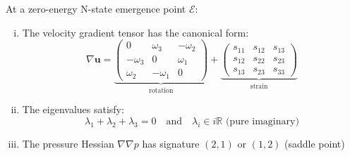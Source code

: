 \begin{theorem}\label{thm:emergence-structure}
At a zero-energy N-state emergence point $\mathcal{E}$:
\begin{enumerate}[(i)]
\item The velocity gradient tensor has the canonical form:
\begin{equation}
\nabla \mathbf{u} = \underbrace{\begin{pmatrix}
0 & \omega_3 & -\omega_2 \\
-\omega_3 & 0 & \omega_1 \\
\omega_2 & -\omega_1 & 0
\end{pmatrix}}_{\text{rotation}} + \underbrace{\begin{pmatrix}
s_{11} & s_{12} & s_{13} \\
s_{12} & s_{22} & s_{23} \\
s_{13} & s_{23} & s_{33}
\end{pmatrix}}_{\text{strain}}
\end{equation}

\item The eigenvalues satisfy:
\begin{equation}
\lambda_1 + \lambda_2 + \lambda_3 = 0 \quad \text{and} \quad \lambda_i \in i\mathbb{R} \text{ (pure imaginary)}
\end{equation}

\item The pressure Hessian $\nabla \nabla p$ has signature $(2,1)$ or $(1,2)$ (saddle point)
\end{enumerate}
\end{theorem}

